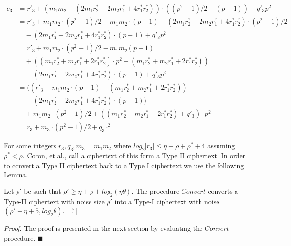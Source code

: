 \documentclass[../../main.tex]{subfiles}
\begin{document}
\begin{equation*}
   \begin{split}
       c_3 &= r'_3 + (m_1m_2 + (2m_1r^*_2 + 2m_2r^*_1 + 4r^*_1r^*_2))\cdot ((p^2-1)/2-(p-1)) + q'_3p^2 \\
           &= r'_3 + m_1m_2\cdot (p^2-1)/2 - m_1m_2\cdot(p-1) + (2m_1r^*_2 + 2m_2r^*_1 + 4r^*_1r^*_2)\cdot (p^2-1)/2 \\
           & \quad - (2m_1r^*_2 + 2m_2r^*_1 + 4r^*_1r^*_2)\cdot(p-1)+q'_3p^2\\
           &= r'_3 + m_1m_2\cdot (p^2-1)/2 - m_1m_2(p-1) \\
           & \quad + ((m_1r^*_2+m_2r^*_1+2r^*_1r^*_2)\cdot p^2 - (m_1r^*_2 + m_2r^*_1 + 2r^*_1r^*_2))\\
           & \quad - (2m_1r^*_2 + 2m_2r^*_1+4r^*_1r^*_2)\cdot (p-1) + q'_3p^2 \\
           &= ((r'_3 - m_1m_2\cdot (p-1) - (m_1r^*_2 + m_2r^*_1 + 2r^*_1r^*_2))\\
           & \quad -  (2m_1r^*_2+2m_2r^*_1+4r^*_1r^*_2)\cdot (p-1))\\
           & \quad + m_1m_2\cdot (p^2-1)/2 + ((m_1r^*_2+m_2r^*_1+2r^*_1r^*_2)+q'_3)\cdot p^2\\
           &= r_3 + m_3\cdot (p^2-1)/2+q_3\cdotp^2
   \end{split}
\end{equation*}

\noindent For some integers $r_3,q_3,m_3 = m_1m_2$ where $log_2|r_3| \leq \eta + \rho + \rho^* + 4$ assuming $\rho^* < \rho$. Coron, et al., call a ciphertext of this form a Type II ciphertext. In order to convert a Type II ciphertext back to a Type I ciphertext we use the following Lemma.

\begin{lemma}
Let $\rho'$ be such that $\rho' \geq \eta + \rho + log_2(\eta\theta)$. The procedure $Convert$ converts a Type-II ciphertext with noise size $\rho'$ into a Type-I ciphertext with noise $(\rho' - \eta + 5, log_2\theta)$. $[7]$
\end{lemma}

\noindent\textit{Proof}. The proof is presented in the next section by evaluating the $Convert$ procedure. $\blacksquare$
\end{document}
